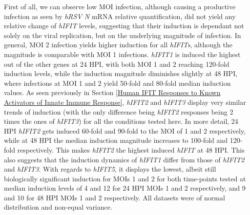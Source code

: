 First of all, we can observe low MOI infection, although causing a productive infection as seen by \textit{hRSV N} mRNA relative quantification, did not yield any relative change of \textit{hIFIT} levels, suggesting that their induction is dependant not solely on the viral replication, but on the underlying magnitude of infection. In general, MOI 2 infection yields higher induction for all \textit{hIFITs}, although the magnitude is comparable with MOI 1 infections. \textit{hIFIT1} is induced the highest out of the other genes at 24 HPI, with both MOI 1 and 2 reaching 120-fold induction levels, while the induction magnitude diminishes slightly at 48 HPI, where infections at MOI 1 and 2 yield 50-fold and 80-fold median induction values. As seen previously in Section \ref{Human IFIT Responses to Known Activators of Innate Immune Response}, \textit{hIFIT2} and \textit{hIFIT3} display very similar trends of induction (with the only difference being \textit{hIFIT2} responses being 2 times the ones of \textit{hIFIT3}) for all the conditions tested here. In more detail, 24 HPI \textit{hIFIT2} gets induced 60-fold and 90-fold to the MOI of 1 and 2 respectively, while at 48 HPI the median induction magnitude increases to 100-fold and 120-fold respectively. This makes \textit{hIFIT2} the highest induced \textit{hIFIT} at 48 HPI. This also suggests that the induction dynamics of \textit{hIFIT1} differ from those of \textit{hIFIT2} and \textit{hIFIT3}. With regards to \textit{hIFIT5}, it displays the lowest, albeit still biologically significant induction for MOIs 1 and 2 for both time-points tested at median induction levels of 4 and 12 for 24 HPI MOIs 1 and 2 respectively, and 9 and 10 for 48 HPI MOIs 1 and 2 respectively. All datasets were of normal distribution and non-equal variance.


